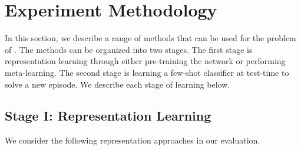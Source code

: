 
\savespacebeforesection
\section{Experiment Methodology}
\savespacebeforesection
\label{sec:method}

In this section, we describe a range of methods that can be used for the
problem of
\titlelower{}. The methods can be organized into two stages. The first stage is
representation learning through either pre-training the network or performing
meta-learning. The second stage is learning a few-shot classifier at test-time
to solve a new episode. We describe each stage of learning below.

\savespacebeforesection
\subsection{Stage I: Representation Learning}
\label{sec:ft}
\savespacebeforesection
We consider the following representation approaches in our evaluation.
\savespacebeforesection
